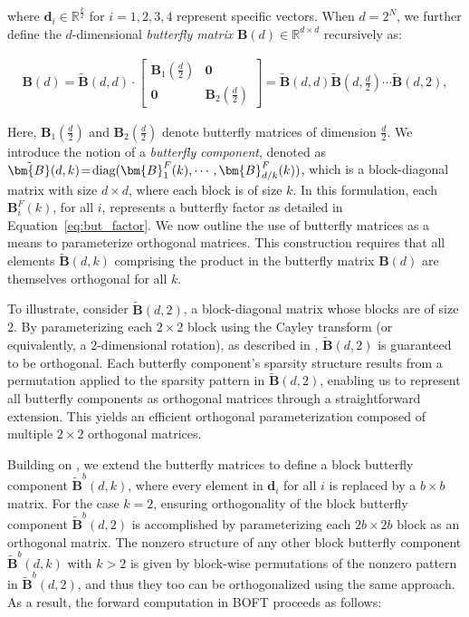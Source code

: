 where $\bm{d}_i\in\mathbb{R}^{\frac{k}{2}}$ for $i=1,2,3,4$ represent specific vectors. When $d=2^N$, we further define the $d$-dimensional \emph{butterfly matrix} $\bm{B}(d)\in\mathbb{R}^{d\times d}$ recursively as:

\begin{equation}
\begin{aligned}
    \!\!\bm{B}(d)=\tilde{\bm{B}}(d,d)\!\cdot\!\begin{bmatrix}
    \bm{B}_1(\frac{d}{2})\!\!\!\!\! & \bm{0} \\
    \bm{0}\!\!\!\!\! &\bm{B}_2(\frac{d}{2})
    \end{bmatrix}= \tilde{\bm{B}}(d,d)\tilde{\bm{B}}(d,\frac{d}{2})\cdots\tilde{\bm{B}}(d,2),
\end{aligned}
\end{equation}

Here, $\bm{B}_1(\frac{d}{2})$ and $\bm{B}_2(\frac{d}{2})$ denote butterfly matrices of dimension $\frac{d}{2}$. We introduce the notion of a \emph{butterfly component}, denoted as $\thickmuskip=2mu \medmuskip=2mu \tilde{\bm{B}}(d,k)=\text{diag}(\bm{B}^F_1(k),\cdots,\bm{B}^F_{d/k}(k))$, which is a block-diagonal matrix with size $d \times d$, where each block is of size $k$. In this formulation, each $\bm{B}^F_i(k)$, for all $i$, represents a butterfly factor as detailed in Equation~\ref{eq:but_factor}. We now outline the use of butterfly matrices as a means to parameterize orthogonal matrices. This construction requires that all elements $\tilde{\bm{B}}(d,k)$ comprising the product in the butterfly matrix $\bm{B}(d)$ are themselves orthogonal for all $k$. 

To illustrate, consider $\tilde{\bm{B}}(d,2)$, a block-diagonal matrix whose blocks are of size $2$. By parameterizing each $2\times 2$ block using the Cayley transform (or equivalently, a $2$-dimensional rotation), as described in \cite{liu2021orthogonal,qiu2023controlling}, $\tilde{\bm{B}}(d,2)$ is guaranteed to be orthogonal. Each butterfly component’s sparsity structure results from a permutation applied to the sparsity pattern in $\tilde{\bm{B}}(d,2)$, enabling us to represent all butterfly components as orthogonal matrices through a straightforward extension. This yields an efficient orthogonal parameterization composed of multiple $2\times2$ orthogonal matrices. 

Building on \cite{chen2022pixelated}, we extend the butterfly matrices to define a block butterfly component $\tilde{\bm{B}}^b(d,k)$, where every element in $\bm{d}_i$ for all $i$ is replaced by a $b\times b$ matrix. For the case $k=2$, ensuring orthogonality of the block butterfly component $\tilde{\bm{B}}^b(d,2)$ is accomplished by parameterizing each $2b\times 2b$ block as an orthogonal matrix. The nonzero structure of any other block butterfly component $\tilde{\bm{B}}^b(d,k)$ with $k>2$ is given by block-wise permutations of the nonzero pattern in $\tilde{\bm{B}}^b(d,2)$, and thus they too can be orthogonalized using the same approach. As a result, the forward computation in BOFT proceeds as follows:

